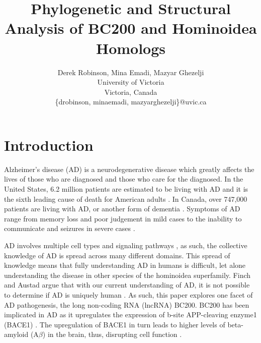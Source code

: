 \documentclass[conference]{IEEEtran}
\begin{document}


\title{Phylogenetic and Structural Analysis of BC200 and Hominoidea Homologs}

\author{Derek Robinson, Mina Emadi, Mazyar Ghezelji\\
University of Victoria\\
Victoria, Canada \\
\{drobinson, minaemadi, mazyarghezelji\}@uvic.ca}

\maketitle

\section{Introduction}\label{sec:intro}

Alzheimer's disease (AD) is a neurodegenerative disease which greatly affects the lives of those who are diagnosed and those who care for the diagnosed. 
In the United States, 6.2 million patients are estimated to be living with AD and it is the sixth leading cause of death for American adults \cite{AlzheimersDisease}. 
In Canada, over 747,000 patients are living with AD, or another form of dementia \cite{ADcanada}. 
Symptoms of AD range from memory loss and poor judgement in mild cases to the inability to communicate and seizures in severe cases \cite{alzheimersSigns}.

AD involves multiple cell types and signaling pathways \cite{zhang2021role}, as such, the collective knowledge of AD is spread across many different domains. 
This spread of knowledge means that fully understanding AD in humans is difficult, let alone understanding the disease in other species of the hominoidea superfamily.
Finch and Austad argue that with our current understanding of AD, it is not possible to determine if AD is uniquely human \cite{finch2015commentary}. 
As such, this paper explores one facet of AD pathogenesis, the long non-coding RNA (lncRNA) BC200. 
BC200 has been implicated in AD as it upregulates the expression of b-site APP-cleaving enzyme1 (BACE1) \cite{li2018identification,zhang2021role}. 
The upregulation of BACE1 in turn leads to higher levels of beta-amyloid (A$\beta$) in the brain, thus, disrupting cell function \cite{li2018identification,zhang2021role}. 
\end{document}
